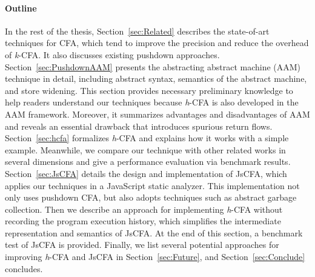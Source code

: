 \documentclass[12pt]{report}
\begin{document}
\paragraph{Outline}
In the rest of the thesis,
Section~\ref{sec:Related} describes the state-of-art techniques for CFA, which tend to improve the precision and reduce the overhead of \textit{k}-CFA\@. It also discusses existing pushdown approaches.
Section~\ref{sec:PushdownAAM} presents the abstracting abstract machine (AAM) technique in detail, including abstract syntax, semantics of the abstract machine, and store widening.
This section provides necessary preliminary knowledge to help readers understand our techniques because \textit{h}-CFA is also developed in the AAM framework.
Moreover, it summarizes advantages and disadvantages of AAM and reveals an essential drawback that introduces spurious return flows.
Section~\ref{sec:hcfa} formalizes \textit{h}-CFA and explains how it works with a simple example.
Meanwhile, we compare our technique with other related works in several dimensions and give a performance evaluation via benchmark results.
Section~\ref{sec:JsCFA} details the design and implementation of JsCFA, which applies our techniques in a JavaScript static analyzer.
This implementation not only uses pushdown CFA, but also adopts techniques
such as abstract garbage collection.
Then we describe an approach for implementing \textit{h}-CFA without recording the program execution history, which simplifies the intermediate representation and semantics of JsCFA\@.
At the end of this section, a benchmark test of JsCFA is provided.
Finally, we list several potential approaches for improving \textit{h}-CFA and JsCFA in Section~\ref{sec:Future}, and Section~\ref{sec:Conclude} concludes.
\end{document}
